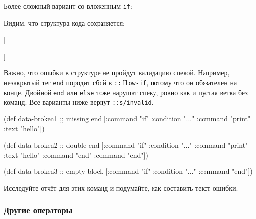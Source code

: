 Более сложный вариант со вложенным \texttt{if}:

\begin{clojure}
\end{clojure}

Видим, что структура кода сохраняется:

\ifnarrow

\begin{clojure}
[[:if
  {:this {:command "if"
          :condition "..."}
   :flow
   [[:if
     {:this {:command "if"
             :condition "..."}
      :flow [[:cmd {:command "print"
                    :text "hello"}]]
      :end {:command "end"}}]]
   :end {:command "end"}}]]
\end{clojure}

\else

\begin{clojure}
[[:if
  {:this {:command "if" :condition "..."}
   :flow
   [[:if
     {:this {:command "if" :condition "..."}
      :flow [[:cmd {:command "print" :text "hello"}]]
      :end {:command "end"}}]]
   :end {:command "end"}}]]
\end{clojure}

\fi

Важно, что ошибки в структуре не пройдут валидацию спекой. Например, незакрытый
тег \texttt{end} породит сбой в \texttt{::flow-if}, потому что он обязателен на
конце. Двойной \texttt{end} или \texttt{else} тоже нарушат спеку, ровно как и
пустая ветка без команд. Все варианты ниже вернут \texttt{::s/invalid}.

\begin{clojure}
(def data-broken1 ;; missing end
  [{:command "if" :condition "..."}
   {:command "print" :text "hello"}])

(def data-broken2 ;; double end
  [{:command "if" :condition "..."}
   {:command "print" :text "hello"}
   {:command "end"}
   {:command "end"}])

(def data-broken3 ;; empty block
  [{:command "if" :condition "..."}
   {:command "end"}])
\end{clojure}

\pagebreakafive

Исследуйте отчёт  для этих команд и подумайте, как составить
текст ошибки.

\subsubsection*{Другие операторы}

